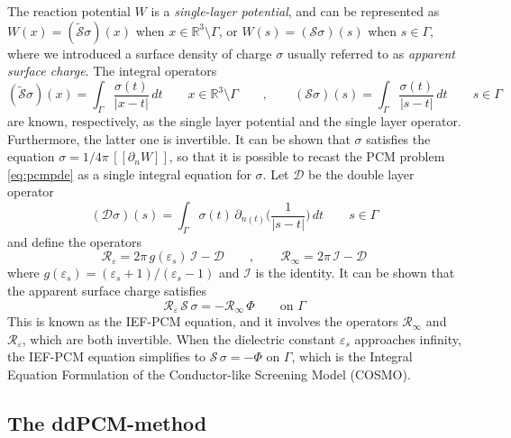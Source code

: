 \documentclass[aip,jcp,a4paper,11pt]{revtex4-1}
\newcommand{\cI}{\mathcal{I}}
\newcommand{\cS}{\mathcal{S}}
\newcommand{\cD}{\mathcal{D}}
\newcommand{\cR}{\mathcal{R}}
\newcommand{\sR}{\mathbb{R}}
\begin{document}
The reaction potential $W$ is a \emph{single-layer potential}, and can be represented\cite{sauter2010boundary} as $W(x) = (\tilde{\mathcal{S}}\sigma)(x)$ when $x \in \sR^3 \setminus \Gamma$, or $W(s) = (\mathcal{S}\sigma)(s)$ when $s \in \Gamma$, where we introduced a surface density of charge $\sigma$ usually referred to as \emph{apparent surface charge}. The integral operators
\begin{equation*}
 (\tilde{\cS}\sigma)(x) = \int_{\Gamma} \frac{\sigma(t)}{|x-t|} \, dt \qquad  x \in \sR^3 \setminus \Gamma \qquad , \qquad  ({\cS}\sigma)(s) = \int_{\Gamma} \frac{\sigma(t)}{|s-t|} \, dt \qquad  s \in \Gamma
\end{equation*}
are known, respectively, as the single layer potential and the single layer operator. Furthermore, the latter one is invertible\cite{Calderon}. It can be shown that $\sigma$ satisfies the equation $\sigma = 1/4\pi \, [\![ \partial_n W]\!]$, so that it is possible to recast the PCM problem \eqref{eq:pcmpde} as a single integral equation for $\sigma$. Let $\cD$ be the double layer operator
\begin{equation}\label{eq:DOper}
 ({\cD}\sigma)(s) = \int_{\Gamma} \sigma(t) \, \partial_{n(t)} \bigg( \frac{1}{|s-t|}\bigg) \,dt \qquad s \in \Gamma
\end{equation}
and define the operators 
\begin{equation}
 \label{eq:Reps}
 \cR_\varepsilon = 2\pi \, g(\varepsilon_s) \, \cI - \cD \qquad, \qquad \cR_\infty = 2\pi \, \cI - \cD
\end{equation}
where $g(\varepsilon_s) = (\varepsilon_s+1)/(\varepsilon_s-1)$ and $\cI$ is the identity. It can be shown\cite{ReviewPCM_2005} that the apparent surface charge satisfies
\begin{equation}
\label{eq:IEFPCM}
\cR_\varepsilon \, \cS \, \sigma = - \cR_\infty \, \Phi \qquad \text{on }\Gamma
\end{equation}
This is known as the IEF-PCM equation, and it involves the operators $\cR_\infty$ and $\cR_\varepsilon$, which are both invertible. When the dielectric constant $\varepsilon_s$ approaches infinity, the IEF-PCM equation simplifies to $\cS \, \sigma = - \Phi$ on $\Gamma$, which is the Integral Equation Formulation of the Conductor-like Screening Model (COSMO)\cite{Lipparini_JCP_VPCM}.


\subsection{The ddPCM-method}
\end{document}
